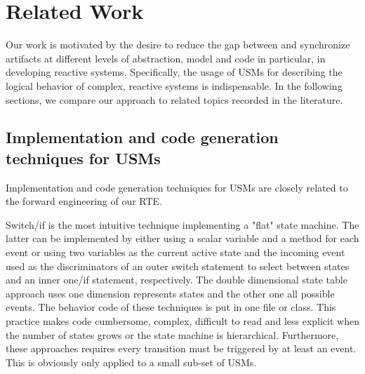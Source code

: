 \section{Related Work}
\label{sec:related_works}
Our work is motivated by the desire to reduce the gap between and synchronize artifacts at different levels of abstraction, model and code in particular, in developing reactive systems. Specifically, the usage of USMs for describing the logical behavior of complex, reactive systems is indispensable. In the following sections, we compare our approach to related topics recorded in the literature.
\subsection{Implementation and code generation techniques for USMs}
Implementation and code generation techniques for USMs are closely related to the forward engineering of our RTE.


Switch/if is the most intuitive technique implementing a "flat" state machine. The latter can be implemented by either
using a scalar variable \cite{Booch1998} and a method for each event or using two variables as the current active state and the incoming event used as the discriminators of an outer switch statement to select between states and an inner one/if statement, respectively. The double dimensional state table approach \cite{Douglass1999} uses one dimension represents states and the other one all possible events. 
The behavior code of these techniques is put in one file or class. This practice makes code cumbersome, complex, difficult to read and less explicit when the number of states grows or the state machine is hierarchical. 
Furthermore, these approaches requires every transition must be triggered by at least an event. This is obviously only applied to a small sub-set of USMs.  
  
